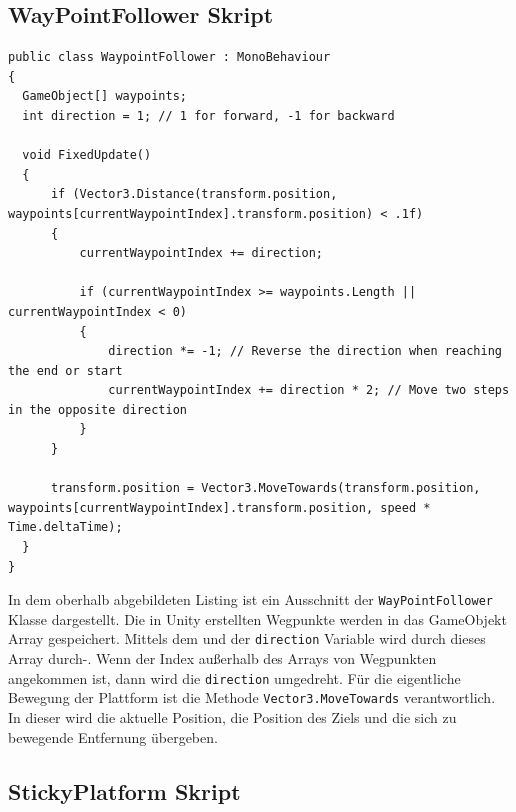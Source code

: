 \subsection{WayPointFollower Skript}

\begin{lstlisting}[language=CSharp,caption={FixedUpdate der WayPointFollower Klasse.},label=code:mainmenu]
public class WaypointFollower : MonoBehaviour
{
  GameObject[] waypoints;
  int direction = 1; // 1 for forward, -1 for backward

  void FixedUpdate()
  {
      if (Vector3.Distance(transform.position, waypoints[currentWaypointIndex].transform.position) < .1f)
      {
          currentWaypointIndex += direction;

          if (currentWaypointIndex >= waypoints.Length || currentWaypointIndex < 0)
          {
              direction *= -1; // Reverse the direction when reaching the end or start
              currentWaypointIndex += direction * 2; // Move two steps in the opposite direction
          }
      }

      transform.position = Vector3.MoveTowards(transform.position, waypoints[currentWaypointIndex].transform.position, speed * Time.deltaTime);
  }
}
\end{lstlisting}

In dem oberhalb abgebildeten Listing ist ein Ausschnitt der \verb+WayPointFollower+ Klasse dargestellt. Die in Unity erstellten Wegpunkte werden in das GameObjekt Array gespeichert. Mittels dem  und der \verb+direction+ Variable wird durch dieses Array durch-. Wenn der Index außerhalb des Arrays von Wegpunkten angekommen ist, dann wird die \verb+direction+ umgedreht. Für die eigentliche Bewegung der Plattform ist die Methode \verb+Vector3.MoveTowards+ verantwortlich. In dieser wird die aktuelle Position, die Position des Ziels und die sich zu bewegende Entfernung übergeben.


\pagebreak

\subsection{StickyPlatform Skript}

